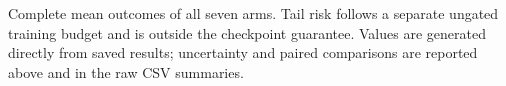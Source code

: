 \begin{table}[p]
\centering\small

\caption{Complete mean outcomes of all seven arms. Tail risk follows a separate
ungated training budget and is outside the checkpoint guarantee. Values are
generated directly from saved results; uncertainty and paired comparisons are
reported above and in the raw CSV summaries.}
\end{table}
